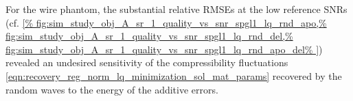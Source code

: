 For
the wire phantom,
the substantial relative \acp{RMSE} at
the low reference \acp{SNR}
(cf. \cref{%
  fig:sim_study_obj_A_sr_1_quality_vs_snr_spgl1_lq_rnd_apo,%
  fig:sim_study_obj_A_sr_1_quality_vs_snr_spgl1_lq_rnd_del,%
  fig:sim_study_obj_A_sr_1_quality_vs_snr_spgl1_lq_rnd_apo_del%
}) revealed
an undesired sensitivity of
the compressibility fluctuations
\eqref{eqn:recovery_reg_norm_lq_minimization_sol_mat_params} recovered by
the random waves to
the energy of
the additive errors.
